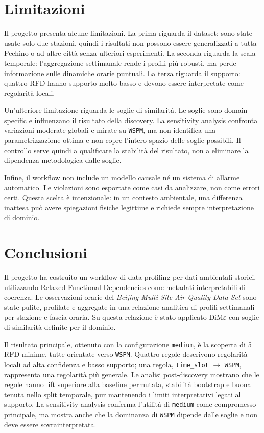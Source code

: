 \documentclass[a4paper,12pt]{article}
\newcommand{\Dime}{DiM\ensuremath{\varepsilon}}
\newcommand{\Wspm}{\texttt{WSPM}}
\newcommand{\TimeSlot}{\texttt{time\_slot}}
\begin{document}
\section{Limitazioni}

Il progetto presenta alcune limitazioni. La prima riguarda il dataset: sono state usate solo due stazioni, quindi i risultati non possono essere generalizzati a tutta Pechino o ad altre città senza ulteriori esperimenti. La seconda riguarda la scala temporale: l'aggregazione settimanale rende i profili più robusti, ma perde informazione sulle dinamiche orarie puntuali. La terza riguarda il supporto: quattro RFD hanno supporto molto basso e devono essere interpretate come regolarità locali.

Un'ulteriore limitazione riguarda le soglie di similarità. Le soglie sono domain-specific e influenzano il risultato della discovery. La sensitivity analysis confronta variazioni moderate globali e mirate su \Wspm, ma non identifica una parametrizzazione ottima e non copre l'intero spazio delle soglie possibili. Il controllo serve quindi a qualificare la stabilità del risultato, non a eliminare la dipendenza metodologica dalle soglie.

Infine, il workflow non include un modello causale né un sistema di allarme automatico. Le violazioni sono esportate come casi da analizzare, non come errori certi. Questa scelta è intenzionale: in un contesto ambientale, una differenza inattesa può avere spiegazioni fisiche legittime e richiede sempre interpretazione di dominio.

\section{Conclusioni}

Il progetto ha costruito un workflow di data profiling per dati ambientali storici, utilizzando Relaxed Functional Dependencies come metadati interpretabili di coerenza. Le osservazioni orarie del \textit{Beijing Multi-Site Air Quality Data Set} sono state pulite, profilate e aggregate in una relazione analitica di profili settimanali per stazione e fascia oraria. Su questa relazione è stato applicato \Dime{} con soglie di similarità definite per il dominio.

Il risultato principale, ottenuto con la configurazione \texttt{medium}, è la scoperta di 5 RFD minime, tutte orientate verso \Wspm. Quattro regole descrivono regolarità locali ad alta confidenza e basso supporto; una regola, \TimeSlot{} $\rightarrow$ \Wspm, rappresenta una regolarità più generale. Le analisi post-discovery mostrano che le regole hanno lift superiore alla baseline permutata, stabilità bootstrap e buona tenuta nello split temporale, pur mantenendo i limiti interpretativi legati al supporto. La sensitivity analysis conferma l'utilità di \texttt{medium} come compromesso principale, ma mostra anche che la dominanza di \Wspm{} dipende dalle soglie e non deve essere sovrainterpretata.
\end{document}
